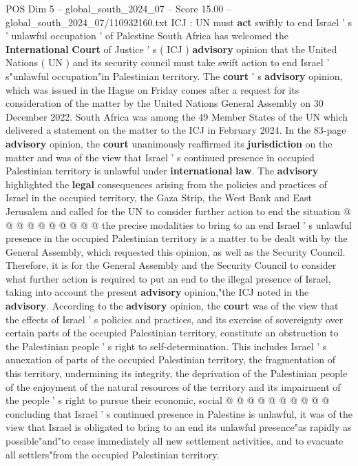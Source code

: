 \begin{textsample}{POS Dim 5 – global\_south\_2024\_07 – Score 15.00 – global\_south\_2024\_07/110932160.txt}  \label{ex:f5_pos_170}
ICJ : UN must \textbf{act} swiftly to end Israel ' s ' unlawful occupation ' of Palestine South Africa has welcomed the \textbf{International} \textbf{Court} of Justice ' s ( ICJ ) \textbf{advisory} opinion that the United Nations ( UN ) and its security council must take swift action to end Israel ' s"unlawful occupation"in Palestinian territory.
The \textbf{court} ' s \textbf{advisory} opinion, which was issued in the Hague on Friday comes after a request for its consideration of the matter by the United Nations General Assembly on 30 December 2022.
South Africa was among the 49 Member States of the UN which delivered a statement on the matter to the ICJ in February 2024.
In the 83-page \textbf{advisory} opinion, the \textbf{court} unanimously reaffirmed its \textbf{jurisdiction} on the matter and was of the view that Israel ' s continued presence in occupied Palestinian territory is unlawful under \textbf{international} \textbf{law}.
The \textbf{advisory} highlighted the \textbf{legal} consequences arising from the policies and practices of Israel in the occupied territory, the Gaza Strip, the West Bank and East Jerusalem and called for the UN to consider further action to end the situation @ @ @ @ @ @ @ @ @ @ the precise modalities to bring to an end Israel ' s unlawful presence in the occupied Palestinian territory is a matter to be dealt with by the General Assembly, which requested this opinion, as well as the Security Council.
Therefore, it is for the General Assembly and the Security Council to consider what further action is required to put an end to the illegal presence of Israel, taking into account the present \textbf{advisory} opinion,"the ICJ noted in the \textbf{advisory}.
According to the \textbf{advisory} opinion, the \textbf{court} was of the view that the effects of Israel ' s policies and practices, and its exercise of sovereignty over certain parts of the occupied Palestinian territory, constitute an obstruction to the Palestinian people ' s right to self-determination.
This includes Israel ' s annexation of parts of the occupied Palestinian territory, the fragmentation of this territory, undermining its integrity, the deprivation of the Palestinian people of the enjoyment of the natural resources of the territory and its impairment of the people ' s right to pursue their economic, social @ @ @ @ @ @ @ @ @ @ concluding that Israel ' s continued presence in Palestine is unlawful, it was of the view that Israel is obligated to bring to an end its unlawful presence"as rapidly as possible"and"to cease immediately all new settlement activities, and to evacuate all settlers"from the occupied Palestinian territory.

\end{textsample}
